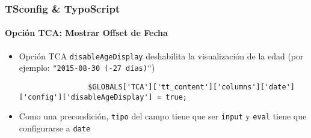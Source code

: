 \begin{frame}[fragile]
	\frametitle{TSconfig \& TypoScript}
	\framesubtitle{Opción TCA: Mostrar Offset de Fecha}

	\lstset{basicstyle=\tiny\ttfamily}

	\begin{itemize}

		\item Opción TCA \texttt{disableAgeDisplay} deshabilita la visualización de la edad\newline
			\small
				(por ejemplo: \texttt{"2015-08-30 (-27 días)"})
			\normalsize

			\begin{lstlisting}
				$GLOBALS['TCA']['tt_content']['columns']['date']['config']['disableAgeDisplay'] = true;
			\end{lstlisting}

		\item Como una precondición, \texttt{tipo} del campo tiene que ser \texttt{input}
			y \texttt{eval} tiene que configurarse a \texttt{date}

	\end{itemize}

\end{frame}

